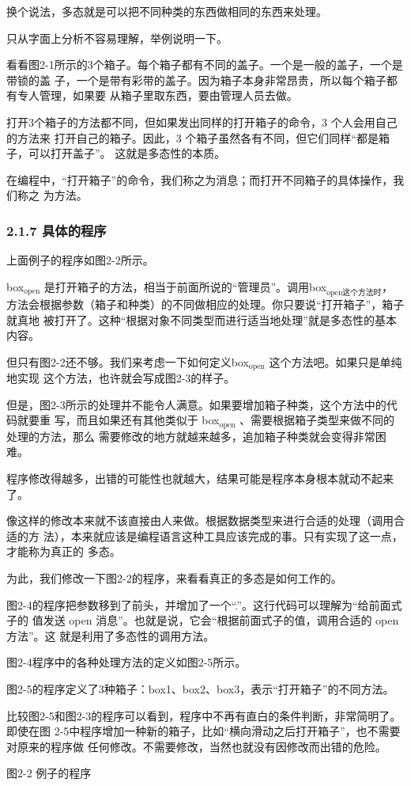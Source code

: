\documentclass[color=cyan,mathpazo,titlestyle=hang]{elegantbook}
\begin{document}
换个说法，多态就是可以把不同种类的东西做相同的东西来处理。

只从字面上分析不容易理解，举例说明一下。

看看图2-1所示的3个箱子。每个箱子都有不同的盖子。一个是一般的盖子，一个是带锁的盖
子，一个是带有彩带的盖子。因为箱子本身非常昂贵，所以每个箱子都有专人管理，如果要
从箱子里取东西，要由管理人员去做。

打开3个箱子的方法都不同，但如果发出同样的打开箱子的命令，3 个人会用自己的方法来
打开自己的箱子。因此，3 个箱子虽然各有不同，但它们同样“都是箱子，可以打开盖子”。
这就是多态性的本质。

在编程中，“打开箱子”的命令，我们称之为消息；而打开不同箱子的具体操作，我们称之
为方法。

\subsubsection{2.1.7 具体的程序}
\label{sec:org1dd1d7c}

上面例子的程序如图2-2所示。

box\(_{\text{open}}\) 是打开箱子的方法，相当于前面所说的“管理员”。调用box\(_{\text{open这个方法时}}\)，
方法会根据参数（箱子和种类）的不同做相应的处理。你只要说“打开箱子”，箱子就真地
被打开了。这种“根据对象不同类型而进行适当地处理”就是多态性的基本内容。

但只有图2-2还不够。我们来考虑一下如何定义box\(_{\text{open}}\) 这个方法吧。如果只是单纯地实现
这个方法，也许就会写成图2-3的样子。

但是，图2-3所示的处理并不能令人满意。如果要增加箱子种类，这个方法中的代码就要重
写，而且如果还有其他类似于 box\(_{\text{open}}\) 、需要根据箱子类型来做不同的处理的方法，那么
需要修改的地方就越来越多，追加箱子种类就会变得非常困难。

程序修改得越多，出错的可能性也就越大，结果可能是程序本身根本就动不起来了。

像这样的修改本来就不该直接由人来做。根据数据类型来进行合适的处理（调用合适的方
法），本来就应该是编程语言这种工具应该完成的事。只有实现了这一点，才能称为真正的
多态。

为此，我们修改一下图2-2的程序，来看看真正的多态是如何工作的。

图2-4的程序把参数移到了前头，并增加了一个“.”。这行代码可以理解为“给前面式子的
值发送 open 消息”。也就是说，它会“根据前面式子的值，调用合适的 open 方法”。这
就是利用了多态性的调用方法。

图2-4程序中的各种处理方法的定义如图2-5所示。

图2-5的程序定义了3种箱子：box1、box2、box3，表示“打开箱子”的不同方法。

比较图2-5和图2-3的程序可以看到，程序中不再有直白的条件判断，非常简明了。即使在图
2-5中程序增加一种新的箱子，比如“横向滑动之后打开箱子”，也不需要对原来的程序做
任何修改。不需要修改，当然也就没有因修改而出错的危险。

图2-2 例子的程序


\end{document}
